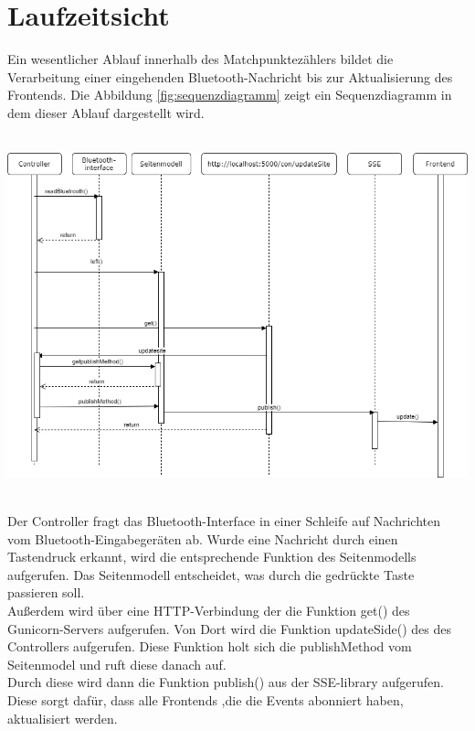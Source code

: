 \chapter{Laufzeitsicht}
Ein wesentlicher Ablauf innerhalb des Matchpunktezählers bildet die Verarbeitung einer eingehenden Bluetooth-Nachricht bis zur Aktualisierung des Frontends. Die Abbildung \ref{fig:sequenzdiagramm}  zeigt ein Sequenzdiagramm in dem dieser Ablauf dargestellt wird.  \\   \\
\begin{minipage}{\textwidth} 
	\centering
	\includegraphics[width=\textwidth]{Bilder/Sequenzdiagramm.png}\\
	\label{fig:sequenzdiagramm}
\end{minipage}
\\[0.5cm]
Der Controller fragt das Bluetooth-Interface in einer Schleife auf Nachrichten vom Bluetooth-Eingabegeräten ab. Wurde eine Nachricht durch einen Tastendruck erkannt, wird die entsprechende Funktion des Seitenmodells aufgerufen. Das Seitenmodell entscheidet, was durch die gedrückte Taste passieren soll.\\   
Außerdem wird über eine HTTP-Verbindung der die Funktion get() des Gunicorn-Servers aufgerufen. Von Dort wird die Funktion updateSide() des des Controllers aufgerufen. Diese Funktion holt sich die publishMethod vom Seitenmodel und ruft diese danach auf.\\
Durch diese wird dann die Funktion publish() aus der SSE-library aufgerufen. Diese sorgt dafür, dass alle Frontends ,die die Events abonniert haben, aktualisiert werden.    